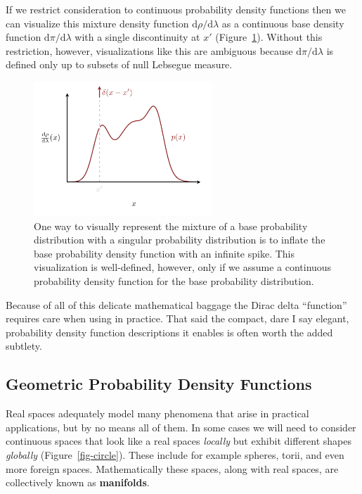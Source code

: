 \documentclass[
  letterpaper,
  DIV=11,
  numbers=noendperiod]{scrartcl}
\begin{document}
If we restrict consideration to continuous probability density functions
then we can visualize this mixture density function
\(\mathrm{d} \rho / \mathrm{d} \lambda\) as a continuous base density
function \(\mathrm{d} \pi / \mathrm{d} \lambda\) with a single
discontinuity at \(x'\) (Figure~\ref{fig-inflation}). Without this
restriction, however, visualizations like this are ambiguous because
\(\mathrm{d} \pi / \mathrm{d} \lambda\) is defined only up to subsets of
null Lebsegue measure.

\begin{figure}

{\centering \includegraphics[width=0.6\textwidth,height=\textheight]{figures/singular_density/inflation/inflation.pdf}

}

\caption{\label{fig-inflation}One way to visually represent the mixture
of a base probability distribution with a singular probability
distribution is to inflate the base probability density function with an
infinite spike. This visualization is well-defined, however, only if we
assume a continuous probability density function for the base
probability distribution.}

\end{figure}

Because of all of this delicate mathematical baggage the Dirac delta
``function'' requires care when using in practice. That said the
compact, dare I say elegant, probability density function descriptions
it enables is often worth the added subtlety.

\hypertarget{geometric-probability-density-functions}{%
\subsection{Geometric Probability Density
Functions}\label{geometric-probability-density-functions}}

Real spaces adequately model many phenomena that arise in practical
applications, but by no means all of them. In some cases we will need to
consider continuous spaces that look like a real spaces \emph{locally}
but exhibit different shapes \emph{globally} (Figure~\ref{fig-circle}).
These include for example spheres, torii, and even more foreign spaces.
Mathematically these spaces, along with real spaces, are collectively
known as \textbf{manifolds}.
\end{document}
